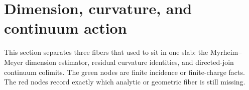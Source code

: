 \section{Dimension, curvature, and continuum action}

This section separates three fibers that used to sit in one slab: the
Myrheim--Meyer dimension estimator, residual curvature identities, and
directed-join continuum colimits.  The green nodes are finite incidence or
finite-charge facts.  The red nodes record exactly which analytic or geometric
fiber is still missing.





